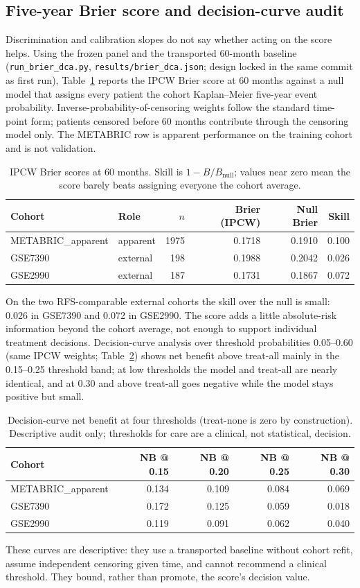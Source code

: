 \subsection{Five-year Brier score and decision-curve audit}
Discrimination and calibration slopes do not say whether acting on the score helps. Using the frozen panel and the transported 60-month baseline (\texttt{run\_brier\_dca.py}, \texttt{results/brier\_dca.json}; design locked in the same commit as first run), Table~\ref{tab:brier-audit} reports the IPCW Brier score at 60 months against a null model that assigns every patient the cohort Kaplan--Meier five-year event probability. Inverse-probability-of-censoring weights follow the standard time-point form; patients censored before 60 months contribute through the censoring model only. The METABRIC row is apparent performance on the training cohort and is not validation.
\begin{table}[htbp]\centering\small
\begin{tabular}{llrrrr}\hline
Cohort & Role & $n$ & Brier (IPCW) & Null Brier & Skill \\ \hline
METABRIC\_apparent & apparent & 1975 & 0.1718 & 0.1910 & 0.100 \\
GSE7390 & external & 198 & 0.1988 & 0.2042 & 0.026 \\
GSE2990 & external & 187 & 0.1731 & 0.1867 & 0.072 \\
\hline\end{tabular}
\caption{IPCW Brier scores at 60 months. Skill is $1 - B/B_{\mathrm{null}}$; values near zero mean the score barely beats assigning everyone the cohort average.}\label{tab:brier-audit}
\end{table}
On the two RFS-comparable external cohorts the skill over the null is small: 0.026 in GSE7390 and 0.072 in GSE2990. The score adds a little absolute-risk information beyond the cohort average, not enough to support individual treatment decisions. Decision-curve analysis over threshold probabilities 0.05--0.60 (same IPCW weights; Table~\ref{tab:dca-audit}) shows net benefit above treat-all mainly in the 0.15--0.25 threshold band; at low thresholds the model and treat-all are nearly identical, and at 0.30 and above treat-all goes negative while the model stays positive but small.
\begin{table}[htbp]\centering\small
\begin{tabular}{lrrrr}\hline
Cohort & NB @ 0.15 & NB @ 0.20 & NB @ 0.25 & NB @ 0.30 \\ \hline
METABRIC\_apparent & 0.134 & 0.109 & 0.084 & 0.069 \\
GSE7390 & 0.172 & 0.125 & 0.059 & 0.018 \\
GSE2990 & 0.119 & 0.091 & 0.062 & 0.040 \\
\hline\end{tabular}
\caption{Decision-curve net benefit at four thresholds (treat-none is zero by construction). Descriptive audit only; thresholds for care are a clinical, not statistical, decision.}\label{tab:dca-audit}
\end{table}
These curves are descriptive: they use a transported baseline without cohort refit, assume independent censoring given time, and cannot recommend a clinical threshold. They bound, rather than promote, the score's decision value.
